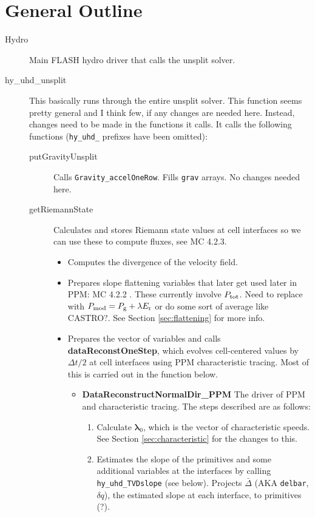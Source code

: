 \documentclass[preprint,11pt]{aastex}
\begin{document}
\section{General Outline}
\label{sec:flowchart}
\begin{description}
	\item[Hydro] Main FLASH hydro driver that calls the unsplit solver.
	\item[hy\_uhd\_unsplit] This basically runs through the entire unsplit solver.  {\color{blue}This function seems pretty general and I think few, if any changes are needed here.  Instead, changes need to be made in the functions it calls.}  It calls the following functions (\verb!hy_uhd_! prefixes have been omitted):
	\begin{description}
		\item[putGravityUnsplit] Calls \verb!Gravity_accelOneRow!.  Fills \verb!grav! arrays.  {\color{blue}No changes needed here}.
		\item[getRiemannState]  Calculates and stores Riemann state values at cell interfaces so we can use these to compute fluxes, see MC 4.2.3.
		\begin{itemize}
			\item Computes the divergence of the velocity field.
			\item Prepares slope flattening variables that later get used later in PPM: MC 4.2.2 . {\color{red} These currently involve $P_{\rm tot}$.} {\color{blue} Need to replace with $P_{\rm mod} = P_{\rm g} + \lambda E_{\rm r}$ or do some sort of average like CASTRO?}.  See Section \ref{sec:flattening} for more info.
			\item Prepares the vector of variables and calls \textbf{dataReconstOneStep}, which evolves cell-centered values by $\Delta t / 2$ at cell interfaces using PPM characteristic tracing.  Most of this is carried out in the function below.
			\begin{itemize}
				\item \textbf{DataReconstructNormalDir\_PPM} The driver of PPM and characteristic tracing.  The steps described are as follows:
				\begin{enumerate}
					\item Calculate $\boldsymbol{\lambda}_0$, which is the vector of characteristic speeds. {\color{red} See Section \ref{sec:characteristic} for the changes to this.}
					\item Estimates the slope of the primitives and some additional variables at the interfaces by calling \verb!hy_uhd_TVDslope! (see below).  Projects $\bar{\Delta}$ (AKA \verb!delbar!, $\delta q$), the estimated slope at each interface, to primitives (?).%

\end{enumerate}
\end{itemize}
\end{itemize}
\end{description}
\end{description}
\end{document}
